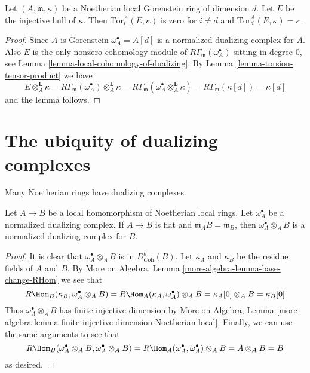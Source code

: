 \begin{lemma}
\label{lemma-tor-injective-hull}
Let $(A, \mathfrak m, \kappa)$ be a Noetherian local Gorenstein ring
of dimension $d$. Let $E$ be the injective hull of $\kappa$. Then
$\text{Tor}_i^A(E, \kappa)$ is zero for $i \not = d$
and $\text{Tor}_d^A(E, \kappa) = \kappa$.
\end{lemma}

\begin{proof}
Since $A$ is Gorenstein $\omega_A^\bullet = A[d]$ is a
normalized dualizing complex for $A$.
Also $E$ is the only nonzero cohomology module of
$R\Gamma_\mathfrak m(\omega_A^\bullet)$ sitting in degree $0$, see
Lemma \ref{lemma-local-cohomology-of-dualizing}.
By Lemma \ref{lemma-torsion-tensor-product} we have
$$
E \otimes_A^\mathbf{L} \kappa =
R\Gamma_\mathfrak m(\omega_A^\bullet) \otimes_A^\mathbf{L} \kappa =
R\Gamma_\mathfrak m(\omega_A^\bullet \otimes_A^\mathbf{L} \kappa) =
R\Gamma_\mathfrak m(\kappa[d]) = \kappa[d]
$$
and the lemma follows.
\end{proof}




\section{The ubiquity of dualizing complexes}
\label{section-ubiquity-dualizing}

\noindent
Many Noetherian rings have dualizing complexes.

\begin{lemma}
\label{lemma-flat-unramified}
Let $A \to B$ be a local homomorphism of Noetherian local rings.
Let $\omega_A^\bullet$ be a normalized dualizing complex.
If $A \to B$ is flat and $\mathfrak m_A B = \mathfrak m_B$,
then $\omega_A^\bullet \otimes_A B$ is a normalized dualizing
complex for $B$.
\end{lemma}

\begin{proof}
It is clear that $\omega_A^\bullet \otimes_A B$ is in $D^b_{\textit{Coh}}(B)$.
Let $\kappa_A$ and $\kappa_B$ be the residue fields of $A$ and $B$.
By More on Algebra, Lemma \ref{more-algebra-lemma-base-change-RHom}
we see that
$$
R\Hom_B(\kappa_B, \omega_A^\bullet \otimes_A B) =
R\Hom_A(\kappa_A, \omega_A^\bullet) \otimes_A B =
\kappa_A[0] \otimes_A B = \kappa_B[0]
$$
Thus $\omega_A^\bullet \otimes_A B$ has finite injective dimension by
More on Algebra, Lemma
\ref{more-algebra-lemma-finite-injective-dimension-Noetherian-local}.
Finally, we can use the same arguments to see that
$$
R\Hom_B(\omega_A^\bullet \otimes_A B, \omega_A^\bullet \otimes_A B) =
R\Hom_A(\omega_A^\bullet, \omega_A^\bullet) \otimes_A B = A \otimes_A B = B
$$
as desired.
\end{proof}

